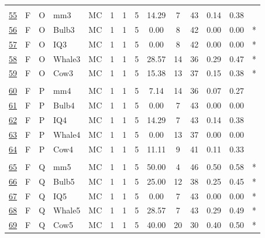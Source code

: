 \documentclass[12pt,english,nohyper]{tufte-handout}\usepackage[]{graphicx}\usepackage[]{color}
\begin{document}
\begin{longtable}{cccl|cccc|ccccc|l}
   &  &  &  &  &  &  &  &  &  &  &  &  &  \\ 
  \hyperlink{T06.F.O.05.1.1.MC.mm3.2}{55} & F & O & mm3 & MC &   1 &   1 &   5 & 14.29 &   7 &  43 & 0.14 & 0.38 &  \\ 
  \hyperlink{T06.F.O.05.1.1.MC.Bulb3.2}{56} & F & O & Bulb3 & MC &   1 &   1 &   5 & 0.00 &   8 &  42 & 0.00 & 0.00 & * \\ 
  \hyperlink{T06.F.O.05.1.1.MC.IQ3.2}{57} & F & O & IQ3 & MC &   1 &   1 &   5 & 0.00 &   8 &  42 & 0.00 & 0.00 & * \\ 
  \hyperlink{T06.F.O.05.1.1.MC.Whale3.2}{58} & F & O & Whale3 & MC &   1 &   1 &   5 & 28.57 &  14 &  36 & 0.29 & 0.47 & * \\ 
  \hyperlink{T06.F.O.05.1.1.MC.Cow3.2}{59} & F & O & Cow3 & MC &   1 &   1 &   5 & 15.38 &  13 &  37 & 0.15 & 0.38 & * \\ 
   &  &  &  &  &  &  &  &  &  &  &  &  &  \\ 
  \hyperlink{T06.F.P.05.1.1.MC.mm4.2}{60} & F & P & mm4 & MC &   1 &   1 &   5 & 7.14 &  14 &  36 & 0.07 & 0.27 &  \\ 
  \hyperlink{T06.F.P.05.1.1.MC.Bulb4.2}{61} & F & P & Bulb4 & MC &   1 &   1 &   5 & 0.00 &   7 &  43 & 0.00 & 0.00 &  \\ 
  \hyperlink{T06.F.P.05.1.1.MC.IQ4.2}{62} & F & P & IQ4 & MC &   1 &   1 &   5 & 14.29 &   7 &  43 & 0.14 & 0.38 &  \\ 
  \hyperlink{T06.F.P.05.1.1.MC.Whale4.2}{63} & F & P & Whale4 & MC &   1 &   1 &   5 & 0.00 &  13 &  37 & 0.00 & 0.00 &  \\ 
  \hyperlink{T06.F.P.05.1.1.MC.Cow4.2}{64} & F & P & Cow4 & MC &   1 &   1 &   5 & 11.11 &   9 &  41 & 0.11 & 0.33 &  \\ 
   &  &  &  &  &  &  &  &  &  &  &  &  &  \\ 
  \hyperlink{T06.F.Q.05.1.1.MC.mm5.2}{65} & F & Q & mm5 & MC &   1 &   1 &   5 & 50.00 &   4 &  46 & 0.50 & 0.58 & * \\ 
  \hyperlink{T06.F.Q.05.1.1.MC.Bulb5.2}{66} & F & Q & Bulb5 & MC &   1 &   1 &   5 & 25.00 &  12 &  38 & 0.25 & 0.45 & * \\ 
  \hyperlink{T06.F.Q.05.1.1.MC.IQ5.2}{67} & F & Q & IQ5 & MC &   1 &   1 &   5 & 0.00 &   7 &  43 & 0.00 & 0.00 & * \\ 
  \hyperlink{T06.F.Q.05.1.1.MC.Whale5.2}{68} & F & Q & Whale5 & MC &   1 &   1 &   5 & 28.57 &   7 &  43 & 0.29 & 0.49 & * \\ 
  \hyperlink{T06.F.Q.05.1.1.MC.Cow5.2}{69} & F & Q & Cow5 & MC &   1 &   1 &   5 & 40.00 &  20 &  30 & 0.40 & 0.50 & * \\ 

\end{longtable}
\end{document}
